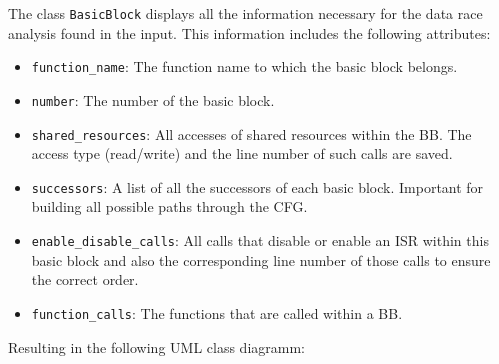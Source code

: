 \documentclass[
fancyheadings, %
%
%
]{stsreprt}
\begin{document}
{The class \texttt{BasicBlock} displays all the information necessary for the data race analysis found in the input. This information includes the following attributes:
\begin{itemize}
	\item \texttt{function\_name}: The function name to which the basic block belongs.
	\item \texttt{number}: The number of the basic block.
	\item \texttt{shared\_resources}: All accesses of shared resources within the \ac{BB}. The access type (read/write) and the line number of such calls are saved.
	\item \texttt{successors}: A list of all the successors of each basic block. Important for building all possible paths through the CFG.
	\item \texttt{enable\_disable\_calls}: All calls that disable or enable an \ac{ISR} within this basic block and also the corresponding line number of those calls to ensure the correct order.
	\item \texttt{function\_calls}: The functions that are called within a \ac{BB}.
\end{itemize}
Resulting in the following UML class diagramm:
\begin{figure}[H]
	\centering
{}
\end{figure}}
\end{document}
